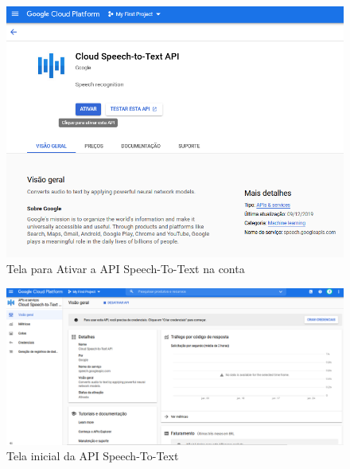 \begin{figure}[h!]
\centering
\caption{Tela para Ativar a API Speech-To-Text na conta}
\label{AtivarAPI}
\includegraphics[width=150mm]{images/ConfigurarGoogle/AtivarAPI.PNG}
\end{figure}

\begin{figure}[h!]
\centering
\caption{Tela inicial da API Speech-To-Text}
\label{telainicialAPI}
\includegraphics[width=150mm]{images/ConfigurarGoogle/telainicialSpeechToText.PNG}
\end{figure}

